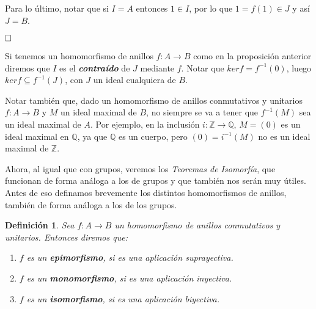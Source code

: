 \documentclass[12pt]{article}
\newtheorem{definition}[theorem]{Definición}
\begin{document}
Para lo último, notar que si $I = A$ entonces $1 \in I$, por lo que $1 = f(1) \in J$ y así $J=B$.

$\hfill \square$

Si tenemos un homomorfismo de anillos $f \colon A\longrightarrow B$ como en la proposición anterior diremos que $I$ es el \textbf{\textit{contraído}} de $J$ mediante $f$. Notar que $ker f = f^{-1}(0)$, luego $ker f \subseteq f^{-1}(J)$, con $J$ un ideal cualquiera de $B$.

Notar también que, dado un homomorfismo de anillos conmutativos y unitarios $f \colon A \longrightarrow B$ y $M$ un ideal maximal de $B$, no siempre se va a tener que $f^{-1}(M)$ sea un ideal maximal de $A$. Por ejemplo, en la inclusión $i \colon \mathbb{Z} \longrightarrow \mathbb{Q}$, $M = ( 0 )$ es un ideal maximal en $\mathbb{Q}$, ya que $\mathbb{Q}$ es un cuerpo, pero $( 0 ) = i^{-1}(M)$ no es un ideal maximal de $\mathbb{Z}$. 

Ahora, al igual que con grupos, veremos los \textit{Teoremas de Isomorfía}, que funcionan de forma análoga a los de grupos y que también nos serán muy útiles. Antes de eso definamos brevemente los distintos homomorfismos de anillos, también de forma análoga a los de los grupos.

\begin{definition} Sea $f \colon A \longrightarrow B$ un homomorfismo de anillos conmutativos y unitarios. Entonces diremos que: \begin{enumerate}
\item $f$ es un \textbf{epimorfismo}, si es una aplicación suprayectiva.
\item $f$ es un \textbf{monomorfismo}, si es una aplicación inyectiva.
\item $f$ es un \textbf{isomorfismo}, si es una aplicación biyectiva.
\end{enumerate}
\end{definition}
\end{document}
